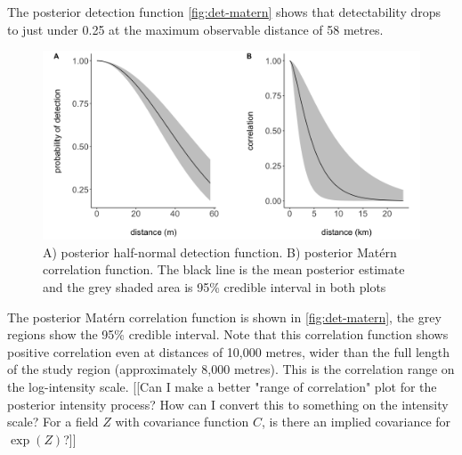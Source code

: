 \documentclass[preprint,12pt]{elsarticle}
\begin{document}
The posterior detection function \autoref{fig:det-matern} shows that detectability drops to just under 0.25 at the maximum observable distance of 58 metres.
\begin{figure}[h]
	\begin{center}
		\includegraphics[scale=0.525]{figures/detfn_and_matern.png}
		\caption{A) posterior half-normal detection function. B) posterior Mat\'ern correlation function.  The black line is the mean posterior estimate and the grey shaded area is 95\% credible interval in both plots}
		\label{fig:det-matern}
	\end{center}
\end{figure}
The posterior Mat\'ern correlation function is shown in \autoref{fig:det-matern}, the grey regions show the 95\% credible interval.  Note that this correlation function shows positive correlation even at distances of 10,000 metres, wider than the full length of the study region (approximately 8,000 metres).  This is the correlation range on the log-intensity scale.  [[Can I make a better "range of correlation" plot for the posterior intensity process?  How can I convert this to something on the intensity scale?  For a field $Z$ with covariance function $C$, is there an implied covariance for $\exp(Z)$?]]
\end{document}
